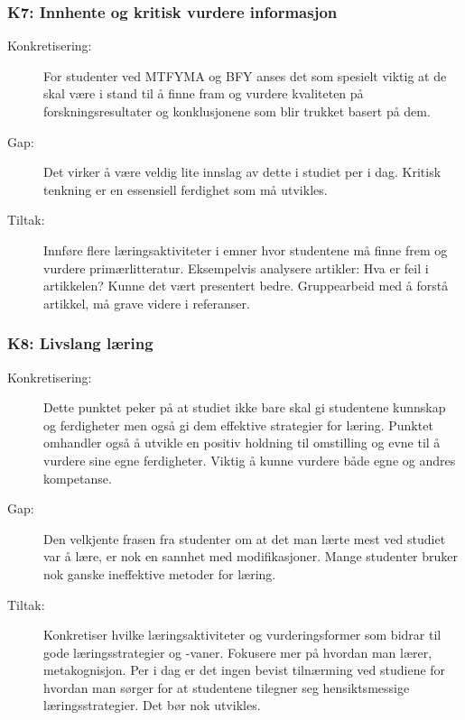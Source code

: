 \subsubsection{K7: Innhente og kritisk vurdere informasjon}
\begin{description}
\item[Konkretisering:] For studenter ved MTFYMA og BFY anses det som spesielt viktig at de skal være i stand til å finne fram og vurdere kvaliteten på forskningsresultater og konklusjonene som blir trukket basert på dem. 
\item[Gap:] Det virker å være veldig lite innslag av dette i studiet per i dag. Kritisk tenkning er en essensiell ferdighet som må utvikles.
\item[Tiltak:] Innføre flere læringsaktiviteter i emner hvor studentene må finne frem og vurdere primærlitteratur. Eksempelvis analysere artikler: Hva er feil i artikkelen? Kunne det vært presentert bedre. Gruppearbeid med å forstå artikkel, må grave videre i referanser.
\end{description}


\subsubsection{K8: Livslang læring}
\begin{description}
\item[Konkretisering:] Dette punktet peker på at studiet ikke bare skal gi studentene kunnskap og ferdigheter men også gi dem effektive strategier for læring. Punktet omhandler også å utvikle en positiv holdning til omstilling og evne til å vurdere sine egne ferdigheter. Viktig å kunne vurdere både egne og andres kompetanse.  
\item[Gap:] Den velkjente frasen fra studenter om at det man lærte mest ved studiet var å lære, er nok en sannhet med modifikasjoner. Mange studenter bruker nok ganske ineffektive metoder for læring. 
\item[Tiltak:] Konkretiser hvilke læringsaktiviteter og vurderingsformer som bidrar til gode læringsstrategier og -vaner. Fokusere mer på hvordan man lærer, metakognisjon. Per i dag er det ingen bevist tilnærming ved studiene for hvordan man sørger for at studentene tilegner seg hensiktsmessige læringsstrategier. Det bør nok utvikles.
\end{description}  

